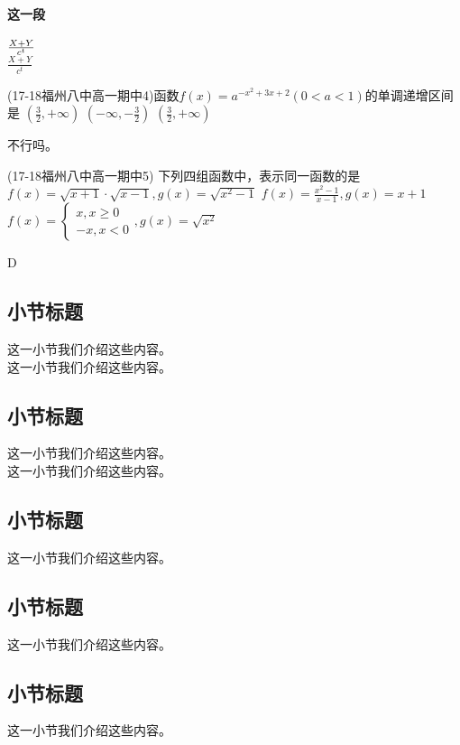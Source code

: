 \documentclass[12pt,UTF8]{ctexart}
\begin{document}
\paragraph{这一段}
$X+Y\over c^t$\\
$\frac{X+Y}{c^t}$
\startexercise
\begin{exercise}
\item (17-18福州八中高一期中4)函数$f(x)=a^{-x^2+3x+2}(0<a<1)$的单调递增区间是\xz
        {$(\frac32,+\infty)$}
        {$(-\infty,-\frac32)$}
        {$(\frac32,+\infty)$}
\begin{answer}
不行吗。
\end{answer}
\item  (17-18福州八中高一期中5) 下列四组函数中，表示同一函数的是\xz
        {$f(x)=\sqrt{x+1}\cdot\sqrt{x-1},g(x)=\sqrt{x^2-1}$}
        {$f(x)=\frac{x^2-1}{x-1},g(x)=x+1$}
        {$f(x)=\begin{cases}x,x\geq0\\-x,x<0\end{cases},g(x)=\sqrt{x^2}$}
\begin{answer}
D
\end{answer}
\end{exercise}
\subsection{小节标题}这一小节我们介绍这些内容。\\
这一小节我们介绍这些内容。
\subsection{小节标题}这一小节我们介绍这些内容。\\
这一小节我们介绍这些内容。
\subsection{小节标题}这一小节我们介绍这些内容。
\subsection{小节标题}这一小节我们介绍这些内容。
\subsection{小节标题}这一小节我们介绍这些内容。
\end{document}
